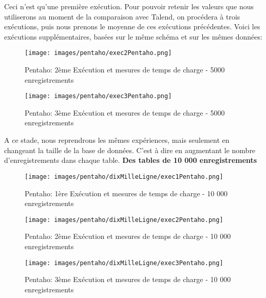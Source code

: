 \documentclass[12pt,a4wide,twoside]{report}
\begin{document}
\begin{itemize}
	Ceci n'est qu'une première exécution. Pour pouvoir retenir les valeurs que nous utiliserons au moment de la comparaison avec Talend, on procédera à trois exécutions, puis nous prenons le moyenne de ces exécutions précédentes.
	Voici les exécutions supplémentaires, basées sur le même schéma et sur les mêmes données: \newpage
			\begin{figure}[!h]
		\texttt{[image: images/pentaho/exec2Pentaho.png]}
		\caption{Pentaho: 2ème Exécution et mesures de temps de charge - 5000 enregistrements}
	\end{figure}
			\begin{figure}[!h]
		\texttt{[image: images/pentaho/exec3Pentaho.png]}
		\caption{Pentaho: 3ème Exécution et mesures de temps de charge - 5000 enregistrements}
	\end{figure}
	\newpage
	A ce stade, nous reprendrons les mêmes expériences, mais seulement en changeant la taille de la base de données. C'est à dire en augmentant le nombre d'enregistrements dans chaque table.\newline
	\textbf{Des tables de 10 000 enregistrements}\newline
	 		\begin{figure}[!h]
		\texttt{[image: images/pentaho/dixMilleLigne/exec1Pentaho.png]}
		\caption{Pentaho: 1ère Exécution et mesures de temps de charge - 10 000 enregistrements}
	\end{figure}
	
		 		\begin{figure}[!h]
		\texttt{[image: images/pentaho/dixMilleLigne/exec2Pentaho.png]}
		\caption{Pentaho: 2ème Exécution et mesures de temps de charge - 10 000 enregistrements}
	\end{figure}
	
		 		\begin{figure}[!h]
		\texttt{[image: images/pentaho/dixMilleLigne/exec3Pentaho.png]}
		\caption{Pentaho: 3ème Exécution et mesures de temps de charge - 10 000 enregistrements}
	\end{figure}
\end{itemize}
\end{document}
